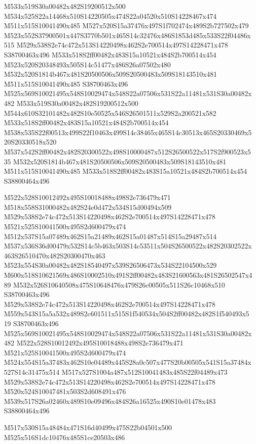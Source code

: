 \documentclass{article}
\begin{document}
\begin{multicols}{2}
M533x519S30a00482x482S19200512x500 M534x525S22a14468x510S14220505x474S22a04520x510S14228467x474 M511x515S10041490x485 M527x520S15a37476x497S1f702474x489S2b727502x479 M523x552S37900501x447S3770b501x465S14c32476x486S1853d485x533S22f04486x515 M529x538S2e74c472x513S14220498x462S2e700514x497S14228471x478 S38700463x496 M533x518S2ff00482x483S15a10521x484S2b700514x454 M523x520S20348493x505S14c51477x486S26a07502x480 M532x520S1814b467x481S20500506x509S20500483x509S18143510x481 M511x515S10041490x485 S38700463x496 M525x569S10021495x548S10029474x548S22a07506x531S22a11481x531S30a00482x482 M533x519S30a00482x482S19200512x500 M544x610S32101482x482S10e50525x546S26501511x529S2a200521x582 M533x518S2ff00482x483S15a10521x484S2b700514x454 M538x535S22f00513x499S22f10463x499S14c38465x465S14c30513x465S20330469x520S20330518x520 M537x542S2ff00482x482S20300522x498S10000487x512S26500522x517S2f900523x535 M532x520S1814b467x481S20500506x509S20500483x509S18143510x481 M511x515S10041490x485 M533x518S2ff00482x483S15a10521x484S2b700514x454 S38800464x496

M522x528S10012492x495S10018488x498S2e736479x471 M518x558S31000482x482S24e0d472x534S15d00494x509 M529x538S2e74c472x513S14220498x462S2e700514x497S14228471x478 M521x525S10041500x495S2d600479x474 M512x537S15a07489x462S15a21489x462S15a01487x514S15a29487x514 M537x536S36d00479x532S14c5b463x503S14c53511x504S26500522x482S20302522x463S26510470x482S20300470x463 M523x554S30a00482x482S18540497x539S26506473x534S22104500x529 M600x518S10621569x486S10002510x491S2ff00482x483S21600563x481S26502547x489 M532x526S10640508x475S10648476x479S26c00505x511S26c10468x510 S38700463x496 M529x538S2e74c472x513S14220498x462S2e700514x497S14228471x478 M559x543S15a5a532x489S2c601511x515S1f540534x504S2ff00482x482S1f540493x519 S38700463x496 M525x569S10021495x548S10029474x548S22a07506x531S22a11481x531S30a00482x482 M522x528S10012492x495S10018488x498S2e736479x471 M521x525S10041500x495S2d600479x474 M524x554S15a37483x462S10e04489x445S28a0c507x477S20b00505x541S15a37484x527S14c31475x514 M517x527S1004a487x512S10041483x485S22f04489x473 M529x538S2e74c472x513S14220498x462S2e700514x497S14228471x478 M520x524S10047481x503S2d608491x476 M539x517S26a02460x489S10e09496x484S26a16525x490S10e01478x483 S38800464x496

\begin{center}
M517x530S15a48484x471S16d40499x475S22b04501x500 M525x516S1dc10476x485S1ce20503x486 
\end{center}



\end{multicols}
\end{document}
